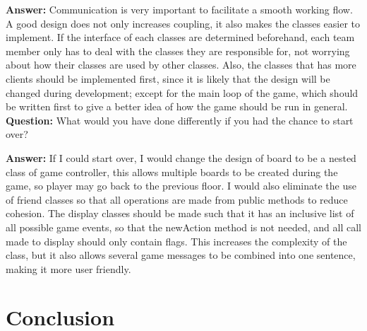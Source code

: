 \documentclass[11pt]{article}
\theoremstyle{plain} \newtheorem{theorem*}{Theorem}[subsection]
\begin{document}
\textbf{Answer:}
Communication is very important to facilitate a smooth working flow. A good
design does not only increases coupling, it also makes the classes easier to
implement. If the interface of each classes are determined beforehand, each
team member only has to deal with the classes they are responsible for, not
worrying about how their classes are used by other classes. Also, the classes
that has more clients should be implemented first, since it is likely that the
design will be changed during development; except for the main loop of the
game, which should be written first to give a better idea of how the game
should be run in general.  \\

\textbf{Question:}
What would you have done differently if you had the chance to start over? 

\textbf{Answer:}
If I could start over, I would change the design of board to be a nested class
of game controller, this allows multiple boards to be created during the game,
so player may go back to the previous floor. I would also eliminate the use of
friend classes so that all operations are made from public methods to reduce
cohesion. The display classes should be made such that it has an inclusive list
of all possible game events, so that the newAction method is not needed, and
all call made to display should only contain flags. This increases the
complexity of the class, but it also allows several game messages to be
combined into one sentence, making it more user friendly.  




\section{Conclusion}
\end{document}
